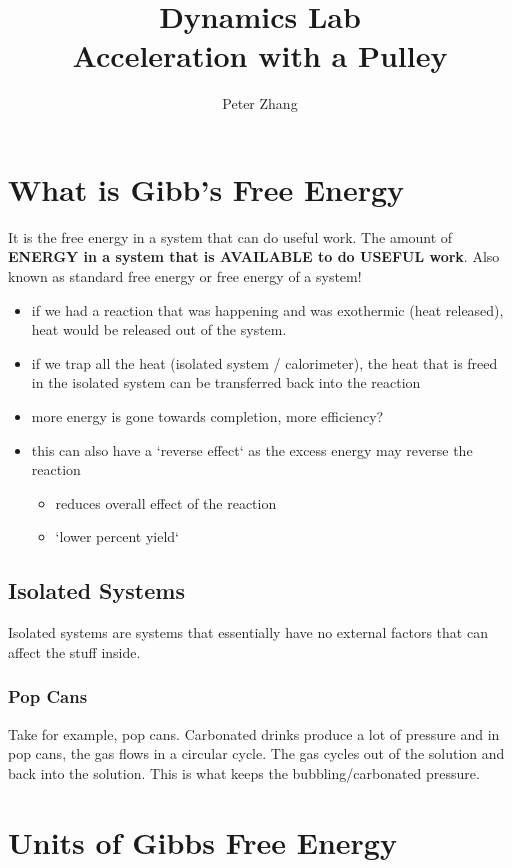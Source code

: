 \documentclass[12pt]{article}
\title{Dynamics Lab\\Acceleration with a Pulley}
\author{Peter Zhang}
\begin{document}
\maketitle
\pagebreak
\tableofcontents
\newpage

\section{What is Gibb's Free Energy}
It is the free energy in a system that can do useful work. The amount of \textbf{ENERGY in a system that is AVAILABLE to do USEFUL work}. Also known as standard free energy or free energy of a system!

\begin{itemize}
\item if we had a reaction that was happening and was exothermic (heat released), heat would be released out of the system.
\item if we trap all the heat (isolated system / calorimeter), the heat that is freed in the isolated system can be transferred back into the reaction
\item more energy is gone towards completion, more efficiency?
\item this can also have a `reverse effect` as the excess energy may reverse the reaction
	\begin{itemize}	
	\item reduces overall effect of the reaction
	\item `lower percent yield`
	\end{itemize}
\end{itemize}

\subsection{Isolated Systems}
Isolated systems are systems that essentially have no external factors that can affect the stuff inside.

\subsubsection{Pop Cans}
Take for example, pop cans. Carbonated drinks produce a lot of pressure and in pop cans, the gas flows in a circular cycle. The gas cycles out of the solution and back into the solution. This is what keeps the bubbling/carbonated pressure.


\section{Units of Gibbs Free Energy}
\end{document}
